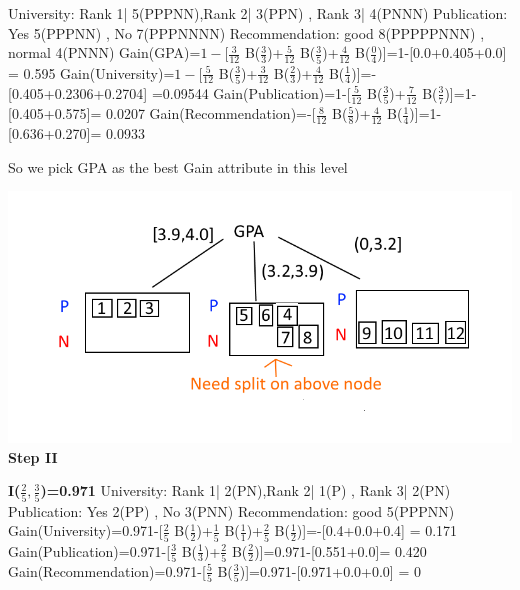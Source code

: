 \documentclass[12pt, letterpaper]{article}
\begin{document}
	\noindent University: Rank 1| 5(PPPNN),Rank 2| 3(PPN) , Rank 3| 4(PNNN)\newline
	Publication: Yes 5(PPPNN) , No 7(PPPNNNN)\newline
	Recommendation: good 8(PPPPPNNN) , normal 4(PNNN)\newline\newline
	Gain(GPA)=$1-$[$\frac{3}{12}$ B($\frac{3}{3}$)+$\frac{5}{12}$ B($\frac{3}{5}$)+$\frac{4}{12}$ B($\frac{0}{4}$)]=1-[0.0+0.405+0.0]
	= 0.595\newline\newline
	Gain(University)=$1-$[$\frac{5}{12}$ B($\frac{3}{5}$)+$\frac{3}{12}$ B($\frac{2}{3}$)+$\frac{4}{12}$ B($\frac{1}{4}$)]=-[0.405+0.2306+0.2704] =0.09544\newline\newline
	Gain(Publication)=1-[$\frac{5}{12}$ B($\frac{3}{5}$)+$\frac{7}{12}$ B($\frac{3}{7}$)]=1-[0.405+0.575]= 0.0207\newline\newline
	Gain(Recommendation)=-[$\frac{8}{12}$ B($\frac{5}{8}$)+$\frac{4}{12}$ B($\frac{1}{4}$)]=1-[0.636+0.270]= 0.0933\newline
	
	So we pick GPA as the best Gain attribute in this level
	
	\includegraphics[scale=0.8]{"problem-2-step1"}
	\textbf{Step II}
	
	\textbf{I($\frac{2}{5},\frac{3}{5}$)=0.971}\newline
	University: Rank 1| 2(PN),Rank 2| 1(P) , Rank 3| 2(PN)\newline
	Publication: Yes 2(PP) , No 3(PNN)\newline
	Recommendation: good 5(PPPNN)\newline\newline
	Gain(University)=0.971-[$\frac{2}{5}$ B($\frac{1}{2}$)+$\frac{1}{5}$ B($\frac{1}{1}$)+$\frac{2}{5}$ B($\frac{1}{2}$)]=-[0.4+0.0+0.4]
	= 0.171\newline\newline
	Gain(Publication)=0.971-[$\frac{3}{5}$ B($\frac{1}{3}$)+$\frac{2}{5}$ B($\frac{2}{2}$)]=0.971-[0.551+0.0]=
	0.420\newline\newline
	Gain(Recommendation)=0.971-[$\frac{5}{5}$ B($\frac{3}{5}$)]=0.971-[0.971+0.0+0.0]
	= 0\newline
	
\end{document}
